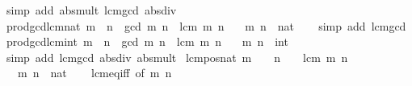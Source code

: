 \begin{isabellebody}
\ {\isacharparenleft}{\kern0pt}simp\ add{\isacharcolon}{\kern0pt}\ abs{\isacharunderscore}{\kern0pt}mult\ lcm{\isacharunderscore}{\kern0pt}gcd\ abs{\isacharunderscore}{\kern0pt}div{\isacharparenright}{\kern0pt}%
\endisatagproof
{\isafoldproof}%
%
\isadelimproof
\isanewline
%
\endisadelimproof
\ \ \isanewline
{}\isamarkupfalse%
\ prod{\isacharunderscore}{\kern0pt}gcd{\isacharunderscore}{\kern0pt}lcm{\isacharunderscore}{\kern0pt}nat{\isacharcolon}{\kern0pt}\ {\isachardoublequoteopen}m\ {\isacharasterisk}{\kern0pt}\ n\ {\isacharequal}{\kern0pt}\ gcd\ m\ n\ {\isacharasterisk}{\kern0pt}\ lcm\ m\ n{\isachardoublequoteclose}\isanewline
\ \ \ m\ n\ {\isacharcolon}{\kern0pt}{\isacharcolon}{\kern0pt}\ nat\isanewline
%
\isadelimproof
\ \ %
\endisadelimproof
%
\isatagproof
{}\isamarkupfalse%
\ {\isacharparenleft}{\kern0pt}simp\ add{\isacharcolon}{\kern0pt}\ lcm{\isacharunderscore}{\kern0pt}gcd{\isacharparenright}{\kern0pt}%
\endisatagproof
{\isafoldproof}%
%
\isadelimproof
\isanewline
%
\endisadelimproof
\isanewline
{}\isamarkupfalse%
\ prod{\isacharunderscore}{\kern0pt}gcd{\isacharunderscore}{\kern0pt}lcm{\isacharunderscore}{\kern0pt}int{\isacharcolon}{\kern0pt}\ {\isachardoublequoteopen}{\isasymbar}m{\isasymbar}\ {\isacharasterisk}{\kern0pt}\ {\isasymbar}n{\isasymbar}\ {\isacharequal}{\kern0pt}\ gcd\ m\ n\ {\isacharasterisk}{\kern0pt}\ lcm\ m\ n{\isachardoublequoteclose}\isanewline
\ \ \ m\ n\ {\isacharcolon}{\kern0pt}{\isacharcolon}{\kern0pt}\ int\isanewline
%
\isadelimproof
\ \ %
\endisadelimproof
%
\isatagproof
{}\isamarkupfalse%
\ {\isacharparenleft}{\kern0pt}simp\ add{\isacharcolon}{\kern0pt}\ lcm{\isacharunderscore}{\kern0pt}gcd\ abs{\isacharunderscore}{\kern0pt}div\ abs{\isacharunderscore}{\kern0pt}mult{\isacharparenright}{\kern0pt}%
\endisatagproof
{\isafoldproof}%
%
\isadelimproof
\isanewline
%
\endisadelimproof
\isanewline
{}\isamarkupfalse%
\ lcm{\isacharunderscore}{\kern0pt}pos{\isacharunderscore}{\kern0pt}nat{\isacharcolon}{\kern0pt}\ {\isachardoublequoteopen}m\ {\isachargreater}{\kern0pt}\ {}\ {\isasymLongrightarrow}\ n\ {\isachargreater}{\kern0pt}\ {}\ {\isasymLongrightarrow}\ lcm\ m\ n\ {\isachargreater}{\kern0pt}\ {}{\isachardoublequoteclose}\isanewline
\ \ \ m\ n\ {\isacharcolon}{\kern0pt}{\isacharcolon}{\kern0pt}\ nat\isanewline
%
\isadelimproof
\ \ %
\endisadelimproof
%
\isatagproof
{}\isamarkupfalse%
\ lcm{\isacharunderscore}{\kern0pt}eq{\isacharunderscore}{\kern0pt}{}{\isacharunderscore}{\kern0pt}iff\ {\isacharbrackleft}{\kern0pt}of\ m\ n{\isacharbrackright}{\kern0pt}\ \isamarkupfalse%

\end{isabellebody}

